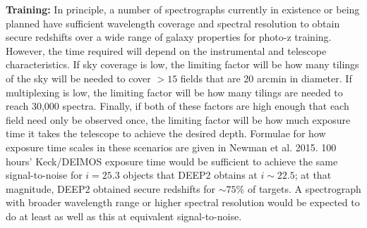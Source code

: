 {\bf Training:} In principle, a number of spectrographs currently in existence or being planned have sufficient wavelength coverage and spectral resolution to obtain secure redshifts over a wide range of galaxy properties for photo-z training.  However, the time required will depend on the instrumental and telescope characteristics.  If sky coverage is low, the limiting factor will be how many tilings of the sky will be needed to cover $>15$ fields that are 20 arcmin in diameter.  If multiplexing is low, the limiting factor will be how many tilings are needed to reach 30,000 spectra.  Finally, if both of these factors are high enough that each field need only be observed once, the limiting factor will be how much exposure time it takes the telescope to achieve the desired depth.  Formulae for how exposure time scales in these scenarios are given in Newman et al. 2015.
%
%
%
%
%
100 hours' Keck/DEIMOS exposure time would be sufficient to achieve the same signal-to-noise for $i=25.3$ objects that DEEP2 obtains at $i \sim 22.5$; at that magnitude, DEEP2 obtained secure redshifts for $\sim 75\%$ of targets.  A spectrograph with broader wavelength range or higher spectral resolution would be expected to do at least as well as this at equivalent signal-to-noise.

